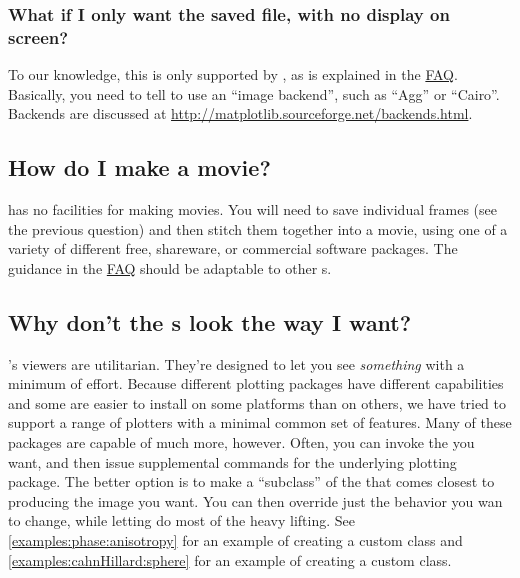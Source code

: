         \subsubsection{What if I only want the saved file, with no
        display on screen?} To our knowledge, this is only supported
        by \Matplotlib{}, as is explained in the
        \href{http://matplotlib.sourceforge.net/faq/howto_faq.html#generate-images-without-having-a-window-popup}{\Matplotlib{}
        FAQ}. Basically, you need to tell \Matplotlib{} to use an
        ``image backend'', such as ``Agg'' or ``Cairo''. Backends are
        discussed at
        \url{http://matplotlib.sourceforge.net/backends.html}.
        

    \subsection{How do I make a movie?} \FiPy{} has no facilities for 
    making movies. You will need to save individual frames (see the 
    previous question) and then stitch them together into a movie, 
    using one of a variety of different free, shareware, or 
    commercial software packages. The guidance in the 
    \href{http://matplotlib.sourceforge.net/faq/howto_faq.html#make-a-movie}{\Matplotlib{}
    FAQ} should be adaptable to other s.
    
    \subsection{Why don't the s look the way I want?}
    \FiPy's viewers are utilitarian. They're designed to let you see 
    \emph{something} with a minimum of effort. Because different 
    plotting packages have different capabilities and some are easier 
    to install on some platforms than on others, we have tried to 
    support a range of \Python{} plotters with a minimal common set of 
    features. Many of these packages are capable of much more, 
    however. Often, you can invoke the  you want, and 
    then issue supplemental commands for the underlying plotting 
    package. The better option is to make a ``subclass'' of the 
    \FiPy{}  that comes closest to producing the image 
    you want. You can then override just the behavior you wan to 
    change, while letting \FiPy{} do most of the heavy lifting. See 
    \ref{examples:phase:anisotropy} for an example of creating a custom 
    \Matplotlib{}  class and 
    \ref{examples:cahnHillard:sphere} for an example of creating a custom 
    \MayaVi{}  class.
    

